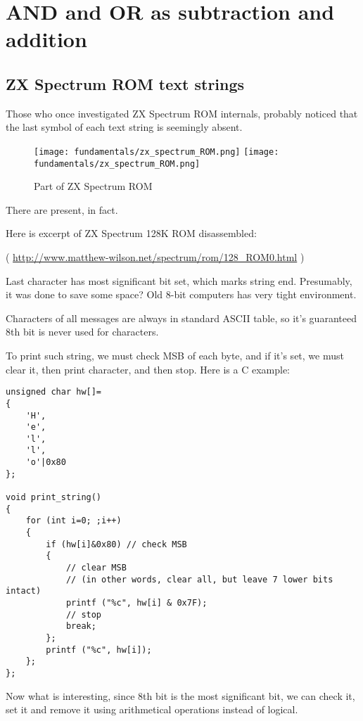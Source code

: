 \section{AND and OR as subtraction and addition}

\subsection{ZX Spectrum ROM text strings}
\label{ZX Spectrum}

Those who once investigated ZX Spectrum \ac{ROM} internals, probably noticed that the last symbol of each text string is seemingly
absent.

\begin{figure}[H]
\centering
\ifdefined\ebook
\texttt{[image: fundamentals/zx\_spectrum\_ROM.png]}
\else
\texttt{[image: fundamentals/zx\_spectrum\_ROM.png]}
\fi
\caption{Part of ZX Spectrum ROM}
\end{figure}

There are present, in fact.

Here is excerpt of ZX Spectrum 128K ROM disassembled:


( \url{http://www.matthew-wilson.net/spectrum/rom/128_ROM0.html} )

Last character has most significant bit set, which marks string end.
Presumably, it was done to save some space?
Old 8-bit computers has very tight environment.

Characters of all messages are always in standard ASCII table, so it's guaranteed 8th bit is never used for characters.

To print such string, we must check \ac{MSB} of each byte, and if it's set, we must clear it, then print character,
and then stop.
Here is a C example:

\begin{lstlisting}[style=customc]
unsigned char hw[]=
{
	'H',
	'e',
	'l',
	'l',
	'o'|0x80
};

void print_string()
{
	for (int i=0; ;i++)
	{
		if (hw[i]&0x80) // check MSB
		{
			// clear MSB
			// (in other words, clear all, but leave 7 lower bits intact)
			printf ("%c", hw[i] & 0x7F);
			// stop
			break;
		};
		printf ("%c", hw[i]);
	};
};
\end{lstlisting}

Now what is interesting, since 8th bit is the most significant bit, we can check it, set it and remove it using
arithmetical operations instead of logical.

